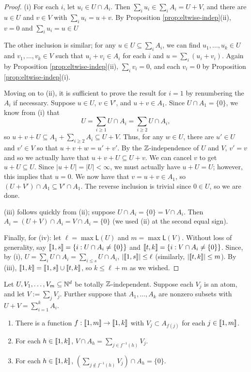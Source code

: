 \begin{proof}
(i) For each $i$, let $u_i\in U\cap A_i$.
Then $\sum_i u_i \in \sum_i A_i = U+V$, and there are $u\in U$ and $v\in V$ with $\sum_i u_i = u+v$.
By Proposition \ref{prop:eltwise-indep}(ii), $v = 0$ and $\sum_i u_i = u \in U$

The other inclusion is similar; for any $u\in U \subseteq \sum_i A_i$, we can find $u_1,\dots,u_k\in U$ and $v_1,\dots, v_k\in V$ such that $u_i+v_i\in A_i$ for each $i$ and $u = \sum_i (u_i + v_i)$.
Again by Proposition \ref{prop:eltwise-indep}(ii), $\sum_i v_i = 0$, and each $v_i = 0$ by Proposition \ref{prop:eltwise-indep}(i).

Moving on to (ii), it is sufficient to prove the result for $i=1$ by renumbering the $A_i$ if necessary.
Suppose $u\in U$, $v\in V'$, and $u+v\in A_1$.
Since $U\cap A_1 = \{0\}$, we know from (i) that
\[ U = \sum_{i\ge 1} U\cap A_i = \sum_{i\ge 2} U\cap A_i, \]
so $u+v + U \subseteq A_1 + \sum_{i\ge 2} A_i \subseteq U+V$.
Thus, for any $w\in U$, there are $u'\in U$ and $v'\in V$ so that $u+v+w = u'+v'$.
By the $\mathbb{Z}$-independence of $U$ and $V$, $v' = v$ and so we actually have that $u+v+U \subseteq U + v$.
We can cancel $v$ to get $u+U \subseteq U$.
Since $|u+U| = |U| <\infty$, we must actually have $u+U = U$; however, this implies that $u = 0$.
We now have that $v = u+v \in A_1$, so $(U+V')\cap A_1 \subseteq V' \cap A_1$.
The reverse inclusion is trivial since $0\in U$, so we are done.

(iii) follows quickly from (ii); suppose $U\cap A_i = \{0\} = V\cap A_i$.
Then $A_i = (U+V)\cap A_i = V\cap A_i = \{0\}$ (we used (ii) at the second equal sign).

Finally, for (iv): let $\ell = \max \mathsf{L}(U)$ and $m = \max\mathsf{L}(V)$.
Without loss of generality, say $\llbracket 1,s \rrbracket = \{i: U\cap A_i \neq \{0\} \}$ and $\llbracket t,k \rrbracket = \{i: V\cap A_i \neq \{0\} \}$.
Since, by (i), $U = \sum_i U\cap A_i = \sum_{i\le s} U \cap A_i$, $| \llbracket 1,s \rrbracket | \le \ell$ (similarly, $|\llbracket t,k \rrbracket| \le m$).
By (iii), $\llbracket 1,k \rrbracket = \llbracket 1,s \rrbracket \cup \llbracket t,k \rrbracket$, so $k \le \ell + m$ as we wished.
\end{proof}

\begin{lemma} \label{lem:indep-atom-decomp}
Let $U, V_1,\dots, V_m\subseteq \mathbb{N}^d$ be totally $\mathbb{Z}$-independent.
Suppose each $V_j$ is an atom, and let $V := \sum_j V_j$.
Further suppose that $A_1,\dots, A_k$ are nonzero subsets with $U+V = \sum_{i=1}^k A_i$.
\begin{enumerate}[label={\rm (\roman{*})}]
	\item There is a function $f: \llbracket 1,m \rrbracket \to \llbracket 1,k \rrbracket$ with $V_j \subset A_{f(j)}$ for each $j\in \llbracket 1,m\rrbracket$.
	\item For each $h\in \llbracket 1,k\rrbracket$, $V\cap A_h = \sum\limits_{j\in f^{-1}(h)} V_j$.
	\item For each $h\in \llbracket 1,k\rrbracket$, $\left( \sum\limits_{j\notin f^{-1}(h)} V_j \right) \cap A_h = \{0\}$.
\end{enumerate}
\end{lemma}

